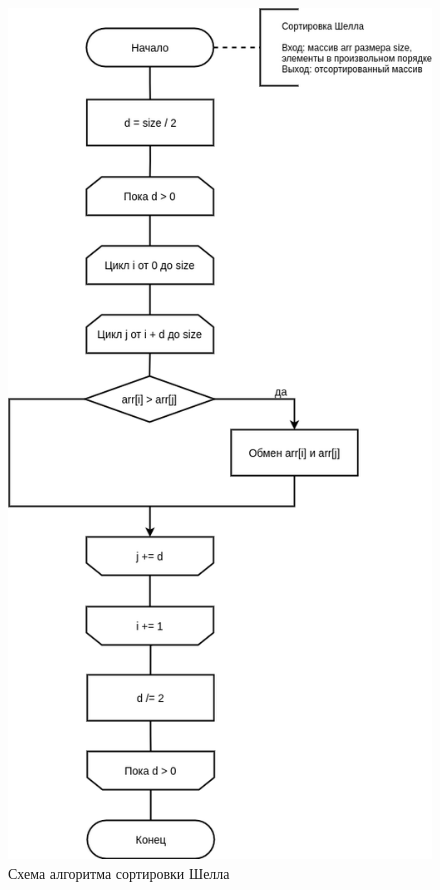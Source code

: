 \begin{figure}[H]
	\begin{center}
		\includegraphics[scale=0.5]{img/shell_sort.png}
	\end{center}
	\captionsetup{justification=centering}
	\caption{Схема алгоритма сортировки Шелла}
	\label{img:shell_sort}
\end{figure}

